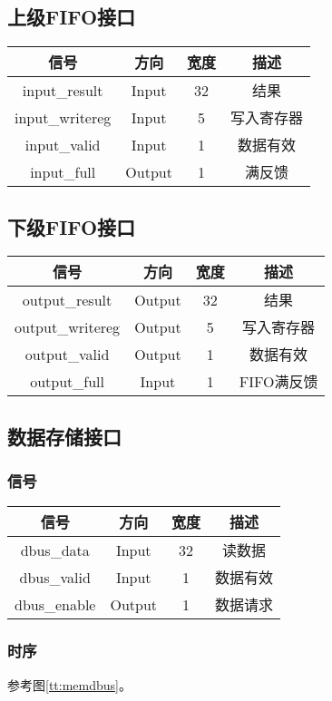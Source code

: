 \documentclass{article}
\newenvironment{signals}{
	\begin{center}
		\begin{tabular}{| c | c | c | c |}
			\hline
			信号 & 方向 & 宽度 & 描述 \\ \hline
}{
		\end{tabular}
	\end{center}
}
\newcommand\sigin{Input}
\newcommand\sigout{Output}
\begin{document}
\subsection{上级FIFO接口}

\begin{signals}
	input\_result & \sigin & 32 & 结果 \\ \hline
	input\_writereg & \sigin & 5 & 写入寄存器 \\ \hline
	input\_valid & \sigin & 1 & 数据有效 \\ \hline
	input\_full & \sigout & 1 & 满反馈 \\ \hline
\end{signals}

\subsection{下级FIFO接口}

\begin{signals}
	output\_result & \sigout & 32 & 结果 \\ \hline
	output\_writereg & \sigout & 5 & 写入寄存器 \\ \hline
	output\_valid & \sigout & 1 & 数据有效 \\ \hline
	output\_full & \sigin & 1 & FIFO满反馈 \\ \hline
\end{signals}

\subsection{数据存储接口}

\subsubsection{信号}

\begin{signals}
	dbus\_data & \sigin & 32 & 读数据 \\ \hline
	dbus\_valid & \sigin & 1 & 数据有效 \\ \hline
	dbus\_enable & \sigout & 1 & 数据请求 \\ \hline
\end{signals}

\subsubsection{时序}

参考图\ref{tt:memdbus}。
\end{document}
